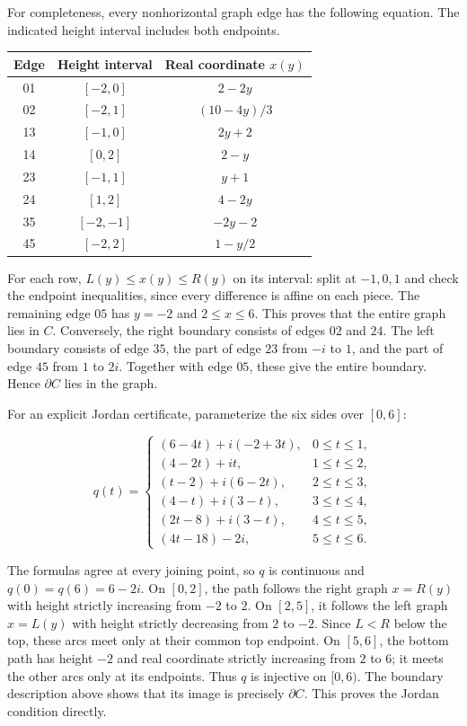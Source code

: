 \documentclass[11pt]{article}
\begin{document}
For completeness, every nonhorizontal graph edge has the following equation. The indicated height interval includes both endpoints.
\begin{center}
\begin{tabular}{@{}ccc@{}}
\toprule Edge & Height interval & Real coordinate $x(y)$\\\midrule
01&$[-2,0]$&$2-2y$\\
02&$[-2,1]$&$(10-4y)/3$\\
13&$[-1,0]$&$2y+2$\\
14&$[0,2]$&$2-y$\\
23&$[-1,1]$&$y+1$\\
24&$[1,2]$&$4-2y$\\
35&$[-2,-1]$&$-2y-2$\\
45&$[-2,2]$&$1-y/2$\\\bottomrule
\end{tabular}
\end{center}
For each row, $L(y)\le x(y)\le R(y)$ on its interval: split at $-1,0,1$ and check the endpoint inequalities, since every difference is affine on each piece. The remaining edge $05$ has $y=-2$ and $2\le x\le6$. This proves that the entire graph lies in $C$. Conversely, the right boundary consists of edges $02$ and $24$. The left boundary consists of edge $35$, the part of edge $23$ from $-i$ to $1$, and the part of edge $45$ from $1$ to $2i$. Together with edge $05$, these give the entire boundary. Hence $\partial C$ lies in the graph.

For an explicit Jordan certificate, parameterize the six sides over
\([0,6]\):

\[
q(t)=
\begin{cases}
(6-4t)+i(-2+3t),&0\le t\le1,\\
(4-2t)+it,&1\le t\le2,\\
(t-2)+i(6-2t),&2\le t\le3,\\
(4-t)+i(3-t),&3\le t\le4,\\
(2t-8)+i(3-t),&4\le t\le5,\\
(4t-18)-2i,&5\le t\le6.
\end{cases}
\]

The formulas agree at every joining point, so $q$ is continuous and $q(0)=q(6)=6-2i$. On $[0,2]$, the path follows the right graph $x=R(y)$ with height strictly increasing from $-2$ to $2$. On $[2,5]$, it follows the left graph $x=L(y)$ with height strictly decreasing from $2$ to $-2$. Since $L<R$ below the top, these arcs meet only at their common top endpoint. On $[5,6]$, the bottom path has height $-2$ and real coordinate strictly increasing from $2$ to $6$; it meets the other arcs only at its endpoints. Thus $q$ is injective on $[0,6)$. The boundary description above shows that its image is precisely $\partial C$. This proves the Jordan condition directly.
\end{document}
